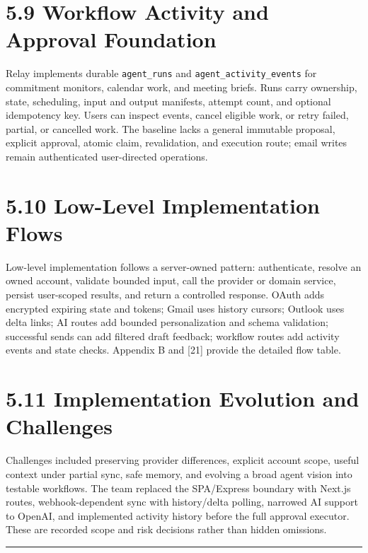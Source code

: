 \documentclass[
]{report}
\begin{document}
\section{5.9 Workflow Activity and Approval
Foundation}\label{59-workflow-activity-and-approval-foundation}

Relay implements durable \texttt{agent\_runs} and
\texttt{agent\_activity\_events} for commitment monitors, calendar work,
and meeting briefs. Runs carry ownership, state, scheduling, input and
output manifests, attempt count, and optional idempotency key. Users can
inspect events, cancel eligible work, or retry failed, partial, or
cancelled work. The baseline lacks a general immutable proposal,
explicit approval, atomic claim, revalidation, and execution route;
email writes remain authenticated user-directed operations.

\section{5.10 Low-Level Implementation
Flows}\label{510-low-level-implementation-flows}

Low-level implementation follows a server-owned pattern: authenticate,
resolve an owned account, validate bounded input, call the provider or
domain service, persist user-scoped results, and return a controlled
response. OAuth adds encrypted expiring state and tokens; Gmail uses
history cursors; Outlook uses delta links; AI routes add bounded
personalization and schema validation; successful sends can add filtered
draft feedback; workflow routes add activity events and state checks.
Appendix B and {[}21{]} provide the detailed flow table.

\section{5.11 Implementation Evolution and
Challenges}\label{511-implementation-evolution-and-challenges}

Challenges included preserving provider differences, explicit account
scope, useful context under partial sync, safe memory, and evolving a
broad agent vision into testable workflows. The team replaced the
SPA/Express boundary with Next.js routes, webhook-dependent sync with
history/delta polling, narrowed AI support to OpenAI, and implemented
activity history before the full approval executor. These are recorded
scope and risk decisions rather than hidden omissions.

\begin{center}\rule{0.5\linewidth}{0.5pt}\end{center}
\end{document}
